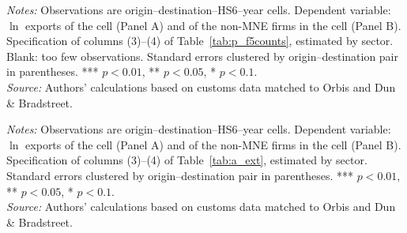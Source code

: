 \documentclass[11pt,a4paper]{article}
\begin{document}
\begin{table}[H]\centering\small%
  \caption{Multinational Presence and Exports by Sector: Intensive Margin}%
  \label{tab:a_f5sum}%
  \par\vspace{3pt}%
  \begin{minipage}{0.95\textwidth}\footnotesize %
  \textit{Notes:} Observations are origin--destination--HS6--year cells. Dependent variable: $\ln$ exports of the cell (Panel A) and of the non-MNE firms in the cell (Panel B). Specification of columns (3)--(4) of Table~\ref{tab:p_f5counts}, estimated by sector. Blank: too few observations. Standard errors clustered by origin--destination pair in parentheses. *** $p<0.01$, ** $p<0.05$, * $p<0.1$.\\[3pt]%
  \textit{Source:} Authors' calculations based on customs data matched to Orbis and Dun \& Bradstreet.%
  \end{minipage}%
  \end{table}
\begin{table}[H]\centering\small%
  \caption{Multinational Presence and Exports by Sector: Extensive Margin}%
  \label{tab:a_f5extsum}%
  \par\vspace{3pt}%
  \begin{minipage}{0.95\textwidth}\footnotesize %
  \textit{Notes:} Observations are origin--destination--HS6--year cells. Dependent variable: $\ln$ exports of the cell (Panel A) and of the non-MNE firms in the cell (Panel B). Specification of columns (3)--(4) of Table~\ref{tab:a_ext}, estimated by sector. Standard errors clustered by origin--destination pair in parentheses. *** $p<0.01$, ** $p<0.05$, * $p<0.1$.\\[3pt]%
  \textit{Source:} Authors' calculations based on customs data matched to Orbis and Dun \& Bradstreet.%
  \end{minipage}%
  \end{table}
\end{document}
